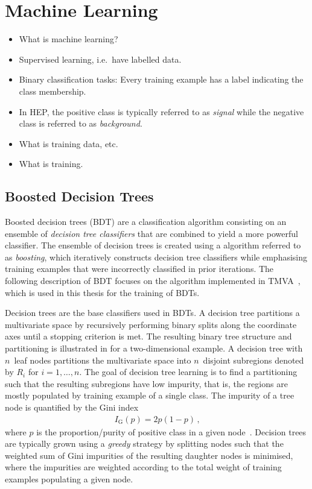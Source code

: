 \section{Machine Learning}

\begin{itemize}
\item What is machine learning?
\item Supervised learning, i.e.\ have labelled data.
\item Binary classification tasks: Every training example has a label indicating
  the class membership.
\item In HEP, the positive class is typically referred to as \emph{signal} while
  the negative class is referred to as \emph{background}.
\item What is training data, etc.
\item What is training.
\end{itemize}


\subsection{Boosted Decision Trees}

Boosted decision trees (BDT) are a classification algorithm consisting on an
ensemble of \emph{decision tree classifiers} that are combined to yield a more
powerful classifier. The ensemble of decision trees is created using a algorithm
referred to as \emph{boosting}, which iteratively constructs decision tree
classifiers while emphasising training examples that were incorrectly classified
in prior iterations. The following description of BDT focuses on the algorithm
implemented in \textsc{TMVA}~\cite{TMVA}, which is used in this thesis for the
training of BDTs.

Decision trees are the base classifiers used in BDTs. A decision tree partitions
a multivariate space by recursively performing binary splits along the
coordinate axes until a stopping criterion is met. The resulting binary tree
structure and partitioning is illustrated in  for a
two-dimensional example. A decision tree with $n$~leaf nodes partitions the
multivariate space into $n$~disjoint subregions denoted by $R_i$ for
$i = 1, \dots, n$. The goal of decision tree learning is to find a partitioning
such that the resulting subregions have low impurity, that is, the regions are
mostly populated by training example of a single class. The impurity of a tree
node is quantified by the Gini index
\begin{align*}
  I_{\text{G}}(p) = 2 p (1 - p) \,\text{,}
\end{align*}
where $p$ is the proportion/purity of positive class in a given
node~\cite{hastie09}. Decision trees are typically grown using a \emph{greedy}
strategy by splitting nodes such that the weighted sum of Gini impurities of the
resulting daughter nodes is minimised, where the impurities are weighted
according to the total weight of training examples populating a given node.



